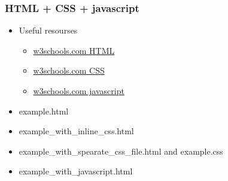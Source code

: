 \documentclass[t]{beamer}
\begin{document}
\begin{frame}[fragile]
    \frametitle{HTML + CSS + javascript}
    \begin{itemize}
        \item Useful resourses
            \begin{itemize}
                \item \href{https://www.w3schools.com/html/default.asp}{w3schools.com HTML}
                \item \href{https://www.w3schools.com/css/default.asp}{w3schools.com CSS}
                \item \href{https://www.w3schools.com/js/DEFAULT.asp}{w3schools.com javascript}
            \end{itemize}
        \item example.html
        \item example_with_inline_css.html
        \item example_with_spearate_css_file.html and example.css
        \item example_with_javascript.html
    \end{itemize}
\end{frame}



\end{document}
